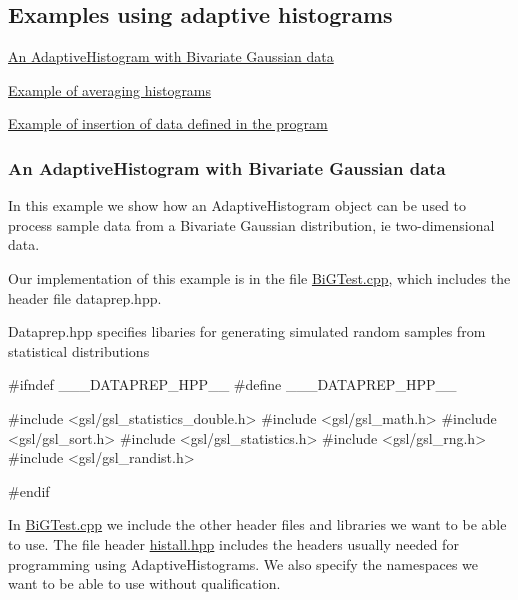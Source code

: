 \hypertarget{AdaptiveHistograms_adhsec_examples}{}\subsection{\-Examples using adaptive histograms}\label{AdaptiveHistograms_adhsec_examples}

\begin{DoxyItemize}
\item \hyperlink{AdaptiveHistograms_adhsubsec_exambivg}{\-An \-Adaptive\-Histogram with \-Bivariate \-Gaussian data}
\item \hyperlink{AdaptiveHistograms_adhsubsec_examaveraging}{\-Example of averaging histograms}
\item \hyperlink{AdaptiveHistograms_adhsubsec_exambyhand}{\-Example of insertion of data defined in the program}
\end{DoxyItemize}\hypertarget{AdaptiveHistograms_adhsubsec_exambivg}{}\subsubsection{\-An Adaptive\-Histogram with Bivariate Gaussian data}\label{AdaptiveHistograms_adhsubsec_exambivg}
\-In this example we show how an \-Adaptive\-Histogram object can be used to process sample data from a \-Bivariate \-Gaussian distribution, ie two-\/dimensional data.

\-Our implementation of this example is in the file \hyperlink{BiGTest_8cpp}{\-Bi\-G\-Test.\-cpp}, which includes the header file dataprep.\-hpp.

\-Dataprep.\-hpp specifies libaries for generating simulated random samples from statistical distributions

\label{AdaptiveHistograms_ADHexamdataprep}%
\hypertarget{AdaptiveHistograms_ADHexamdataprep}{}%



\begin{DoxyCodeInclude}
#ifndef ___DATAPREP_HPP__
#define ___DATAPREP_HPP__

#include <gsl/gsl_statistics_double.h>
#include <gsl/gsl_math.h>
#include <gsl/gsl_sort.h>
#include <gsl/gsl_statistics.h>
#include <gsl/gsl_rng.h>
#include <gsl/gsl_randist.h>

#endif

\end{DoxyCodeInclude}


\-In \hyperlink{BiGTest_8cpp}{\-Bi\-G\-Test.\-cpp} we include the other header files and libraries we want to be able to use. \-The file header \hyperlink{histall_8hpp}{histall.\-hpp} includes the headers usually needed for programming using \-Adaptive\-Histograms. \-We also specify the namespaces we want to be able to use without qualification.




